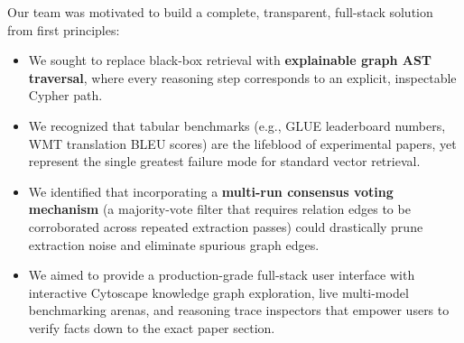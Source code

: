 \documentclass[12pt,a4paper,oneside]{report}
\begin{document}
Our team was motivated to build a complete, transparent, full-stack solution from first principles:
\begin{itemize}
    \item We sought to replace black-box retrieval with \textbf{explainable graph AST traversal}, where every reasoning step corresponds to an explicit, inspectable Cypher path.
    \item We recognized that tabular benchmarks (e.g., GLUE leaderboard numbers, WMT translation BLEU scores) are the lifeblood of experimental papers, yet represent the single greatest failure mode for standard vector retrieval.
    \item We identified that incorporating a \textbf{multi-run consensus voting mechanism} (a majority-vote filter that requires relation edges to be corroborated across repeated extraction passes) could drastically prune extraction noise and eliminate spurious graph edges.
    \item We aimed to provide a production-grade full-stack user interface with interactive Cytoscape knowledge graph exploration, live multi-model benchmarking arenas, and reasoning trace inspectors that empower users to verify facts down to the exact paper section.
\end{itemize}
\end{document}
